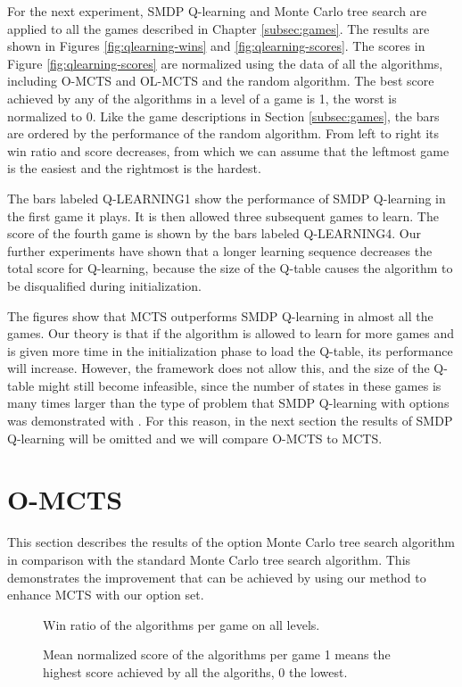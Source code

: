 For the next experiment, SMDP Q-learning and Monte Carlo tree search are applied
to all the games described in Chapter \ref{subsec:games}. The results are shown
in Figures \ref{fig:qlearning-wins} and \ref{fig:qlearning-scores}. The scores
in Figure \ref{fig:qlearning-scores} are normalized using the data of all the
algorithms, including O-MCTS and OL-MCTS and the random algorithm. The best
score achieved by any of the algorithms in a level of a game is 1, the worst is
normalized to 0. Like the game descriptions in Section \ref{subsec:games}, the
bars are ordered by the performance of the random algorithm. From left to right
its win ratio and score decreases, from which we can assume that the leftmost
game is the easiest and the rightmost is the hardest.

The bars labeled Q-LEARNING1 show the performance of SMDP Q-learning in
the first game it plays. It is then allowed three subsequent games to learn.
The score of the fourth game is shown by the bars labeled Q-LEARNING4. Our
further experiments have shown that a longer learning sequence decreases the
total score for Q-learning, because the size of the Q-table causes the algorithm
to be disqualified during initialization.

The figures show that MCTS outperforms SMDP Q-learning in almost all the games.
Our theory is that if the algorithm is allowed to learn for more games and is
given more time in the initialization phase to load the Q-table, its performance
will increase. However, the framework does not allow this, and the size of the
Q-table might still become infeasible, since the number of states in these
games is many times larger than the type of problem that SMDP Q-learning with
options was demonstrated with \cite{sutton1999between}. For this reason, in the
next section the results of SMDP Q-learning will be omitted and we will compare
O-MCTS to MCTS.

\section{O-MCTS}
This section describes the results of the option Monte Carlo tree search
algorithm in comparison with the standard Monte Carlo tree search algorithm.
This demonstrates the improvement that can be achieved by using our method to
enhance MCTS with our option set.

\label{subsec:omcts}
\begin{figure}
	\centering
	\vspace{-.8cm}
	\caption{Win ratio of the algorithms per game on all levels.}
	\label{fig:omcts-wins}
	\centering
	\vspace{-.8cm}
	\caption{Mean normalized score of the algorithms per game 1 means the
	highest score achieved by all the algoriths, 0 the lowest.}
	\label{fig:omcts-scores}
\end{figure}

